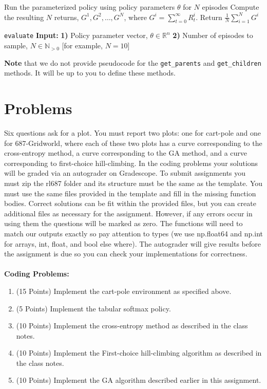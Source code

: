 \documentclass[]{article}
\begin{document}
\begin{algorithm}[H]
    Run the parameterized policy using policy parameters $\theta$ for $N$ episodes\;
    Compute the resulting $N$ returns, $G^1,G^2,\dotsc,G^N$, where
    $
    G^i = \sum_{t=0}^\infty R_t^i.
    $\;
    Return $\frac{1}{N}\sum_{i=1}^N G^i$\;
\caption{\texttt{evaluate}\newline
\textbf{Input:}
\newline \textbf{1)} Policy parameter vector, $\theta \in \mathbb R^n$
\newline \textbf{2)} Number of episodes to sample, $N \in \mathbb N_{>0}$ [for example, $N=10$]}
\label{alg:evaluate}
\end{algorithm}
\textbf{Note} that we do not provide pseudocode for the \texttt{get\_parents} and \texttt{get\_children} methods. It will be up to you to define these methods.  

\section*{Problems}
Six questions ask for a plot. You must report two plots: one for cart-pole and one for 687-Gridworld, where each of these two plots has a curve corresponding to the cross-entropy method, a curve corresponding to the GA method, and a curve corresponding to first-choice hill-climbing. In the coding problems your solutions will be graded via an autograder on Gradescope. To submit assignments you must zip the rl687 folder and its structure must be the same as the template. You must use the same files provided in the template and fill in the missing function bodies. Correct solutions can be fit within the provided files, but you can create additional files as necessary for the assignment. However, if any errors occur in using them the questions will be marked as zero. The functions will need to match our outputs exactly so pay attention to types (we use np.float64 and np.int for arrays, int, float, and bool else where). The autograder will give results before the assignment is due so you can check your implementations for correctness. 
\\\\
\noindent \textbf{Coding Problems:}

\begin{enumerate}
    
    \item{(15 Points) Implement the cart-pole environment as specified above.}
    
    \item{(5 Points) Implement the tabular softmax policy.}
    
    \item{(10 Points) Implement the cross-entropy method as described in the class notes.}
    
    \item{(10 Points) Implement the First-choice hill-climbing algorithm as described in the class notes.}
    
    \item{(10 Points) Implement the GA algorithm described earlier in this assignment.}
\end{enumerate}
\end{document}

